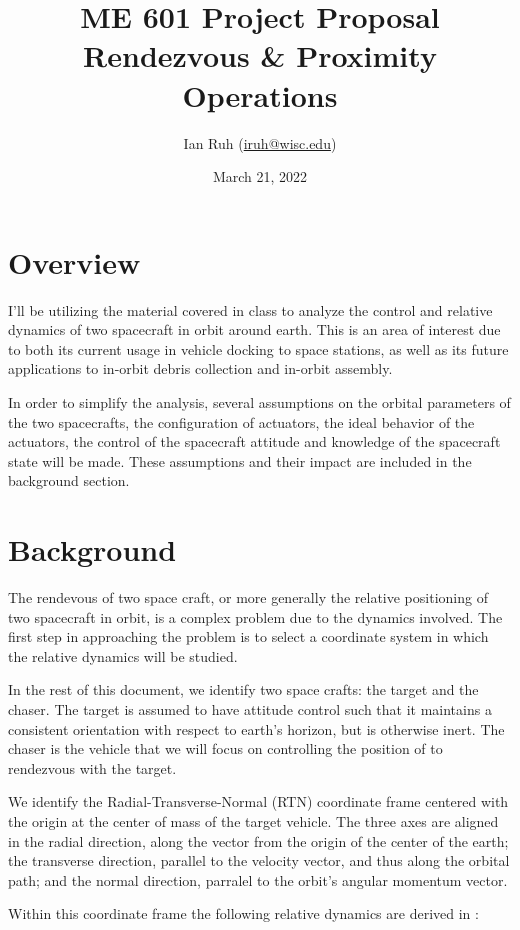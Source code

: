 \documentclass[12pt, letterpaper,titlepage]{article}
\title{ME 601 Project Proposal \\
\textbf{Rendezvous \& Proximity Operations}}
\author{Ian Ruh (\href{mailto:iruh@wisc.edu}{iruh@wisc.edu})}
\date{March 21, 2022}
\begin{document}
\maketitle

\section{Overview}

I'll be utilizing the material covered in class to analyze the control
and relative dynamics of two spacecraft in orbit around earth. This is an
area of interest due to both its current usage in vehicle docking to space
stations, as well as its future applications to in-orbit debris collection and
in-orbit assembly.

In order to simplify the analysis, several assumptions on the orbital
parameters of the two spacecrafts, the configuration of actuators, the ideal
behavior of the actuators, the control of the spacecraft attitude and knowledge
of the spacecraft state will be made. These assumptions and their impact are
included in the background section.

\section{Background}

The rendevous of two space craft, or more generally the relative positioning of
two spacecraft in orbit, is a complex problem due to the dynamics involved. The
first step in approaching the problem is to select a coordinate system in which
the relative dynamics will be studied.

In the rest of this document, we
identify two space crafts: the target and the chaser. The target is assumed to
have attitude control such that it maintains a consistent orientation with
respect to earth's horizon, but is otherwise inert. The chaser is the vehicle
that we will focus on controlling the position of to rendezvous
with the target.

We identify the Radial-Transverse-Normal (RTN) coordinate frame centered with
the origin at the center of mass of the target vehicle. The three axes are
aligned in the radial direction, along the vector from the origin of the center
of the earth; the transverse direction, parallel to the velocity vector, and
thus along the orbital path; and the normal direction, parralel to the orbit's
angular momentum vector.

Within this coordinate frame the following relative dynamics are derived in
\cite{sullivan_comprehensive_2017}:
\end{document}
